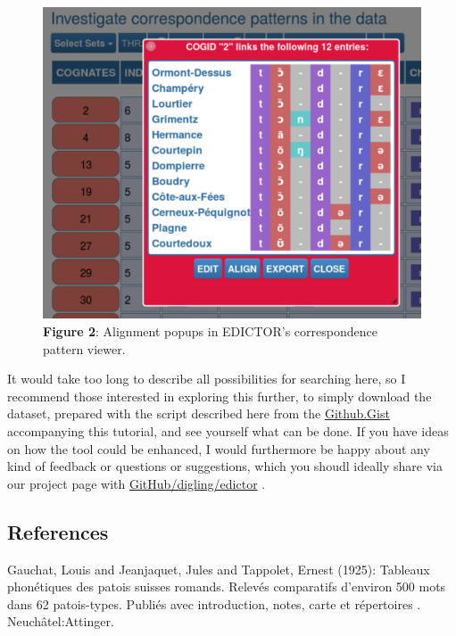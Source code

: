 \documentclass[
  a4paper,
  14pt,
  oneside,
  tablecaptionabove
]{scrbook}
\begin{document}
\begin{figure}[htb]
\centering
\includegraphics[width=\textwidth]{images/__f.hypotheses.org_wp-content_blogs.dir_4500_files_2019_02_edictor3-500x412.png}
\captionsetup{justification=centering}
\caption*{\small \textbf{Figure 2}: Alignment popups in EDICTOR's correspondence pattern viewer.}
\end{figure}

It would take too long to describe all possibilities for searching here,
so I recommend those interested in exploring this further, to simply
download the dataset, prepared with the script described here from the
\href{https://gist.github.com/LinguList/994317214fbdc78460feb551b113b05f}{Github.Gist}
accompanying this tutorial, and see yourself what can be done. If you
have ideas on how the tool could be enhanced, I would furthermore be
happy about any kind of feedback or questions or suggestions, which you
shoudl ideally share via our project page with
\href{https://github.com/digling/edictor}{GitHub/digling/edictor} .

\subsection*{References}

\nopagebreak\hangindent=0.7cm {\small Gauchat, Louis and Jeanjaquet, Jules and Tappolet, Ernest (1925):
Tableaux phonétiques des patois suisses romands. Relevés comparatifs
d'environ 500 mots dans 62 patois-types. Publiés avec introduction,
notes, carte et répertoires . Neuchâtel:Attinger. }
\end{document}
